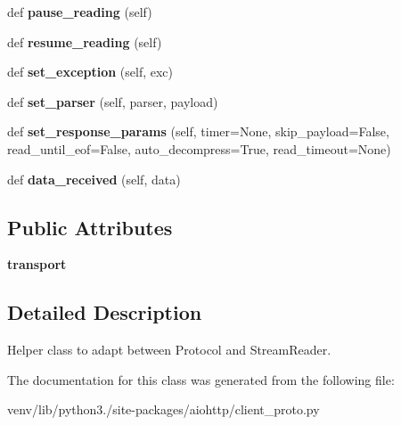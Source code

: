 \begin{DoxyCompactItemize}
def {\bfseries pause\+\_\+reading} (self)
\item 
\mbox{\label{classaiohttp_1_1client__proto_1_1_response_handler_aa763aa66f05ff9bf195608bda58a8f27}} 
def {\bfseries resume\+\_\+reading} (self)
\item 
\mbox{\label{classaiohttp_1_1client__proto_1_1_response_handler_a08e8e120a76bf0583ee672fd3fadb2b2}} 
def {\bfseries set\+\_\+exception} (self, exc)
\item 
\mbox{\label{classaiohttp_1_1client__proto_1_1_response_handler_af0f930cbd00b36116a596eb6351c50cc}} 
def {\bfseries set\+\_\+parser} (self, parser, payload)
\item 
\mbox{\label{classaiohttp_1_1client__proto_1_1_response_handler_abeabd12ef911f10ce4bd47c6b4403fcc}} 
def {\bfseries set\+\_\+response\+\_\+params} (self, timer=None, skip\+\_\+payload=False, read\+\_\+until\+\_\+eof=False, auto\+\_\+decompress=True, read\+\_\+timeout=None)
\item 
\mbox{\label{classaiohttp_1_1client__proto_1_1_response_handler_a658d65ff9fb30da017c456e18cff5acd}} 
def {\bfseries data\+\_\+received} (self, data)
\end{DoxyCompactItemize}
\subsection*{Public Attributes}
\begin{DoxyCompactItemize}
\item 
\mbox{\label{classaiohttp_1_1client__proto_1_1_response_handler_a264fe4a6396c59819755f95490843f47}} 
{\bfseries transport}
\end{DoxyCompactItemize}


\subsection{Detailed Description}
\begin{DoxyVerb}Helper class to adapt between Protocol and StreamReader.\end{DoxyVerb}
 

The documentation for this class was generated from the following file\+:\begin{DoxyCompactItemize}
\item 
venv/lib/python3./site-\/packages/aiohttp/client\+\_\+proto.\+py\end{DoxyCompactItemize}
